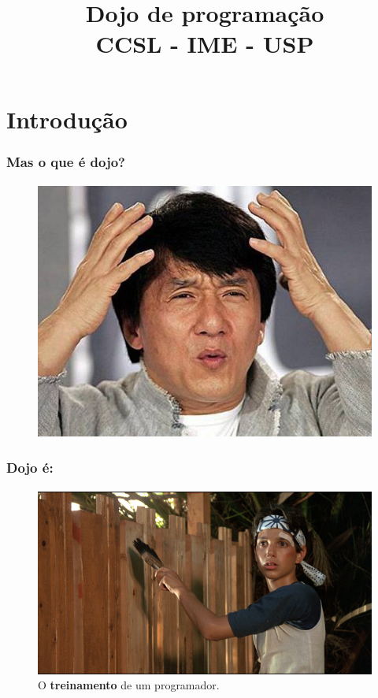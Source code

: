 \documentclass{beamer}
\title{
       \textbf{Dojo de programação} \\
       CCSL - IME - USP
      }
\begin{document}
\maketitle
\section{Introdução}

\begin{frame}
\frametitle{Mas o que é dojo?}
\framesubtitle{}
\begin{figure}[htb]
\begin{center}
\includegraphics[scale=0.5]{jack.jpg}
\end{center}
\end{figure}

\end{frame}

\begin{frame}
\frametitle{Dojo é:}
\framesubtitle{}
\begin{figure}[htb]
\begin{center}
\includegraphics[scale=0.35]{puxo.jpg}
\caption{  O \textbf{treinamento} de um programador.}
\end{center}
\end{figure}
\end{frame}
\end{document}
